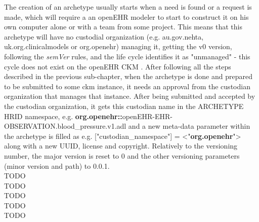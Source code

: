 \documentclass[mim_thesis.tex]{subfiles}
\begin{document}
The creation of an archetype usually starts when a need is found or a request is made, which will require a an openEHR modeler to start to construct it on his own computer alone or with a team from some project. This means that this archetype will have no custodial organization (e.g. au.gov.nehta, uk.org.clinicalmodels or org.openehr) managing it, getting the v0 version, following the \textit{semVer} rules, and the life cycle identifies it as "unmanaged" - this cycle does not exist on the openEHR CKM \citep{openehrckmgover2018}. After following all the steps described in the previous sub-chapter, when the archetype is done and prepared to be submitted to some ckm instance, it needs an approval from the custodian organization that manages that instance. After being submitted and accepted by the custodian organization, it gets this custodian name in the ARCHETYPE HRID namespace, e.g. \textbf{org.openehr::}openEHR-EHR-OBSERVATION.blood\_pressure.v1.adl and a new meta-data parameter within the archetype is filled as  e.g. ["custodian\_namespace"] = <"\textbf{org.openehr}"> along with a new UUID, license and copyright. Relatively to the versioning number, the major version is reset to 0 and the other versioning parameters (minor version and path) to 0.0.1. \\


TODO\\
TODO\\
TODO\\
TODO\\
TODO\\
\end{document}
